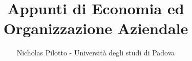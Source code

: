 \documentclass[12pt,a4paper]{article}
\begin{document}
    \author{Nicholas Pilotto - Università degli studi di Padova}
    \title{Appunti di Economia ed Organizzazione Aziendale}

    \maketitle
    \newpage
    \tableofcontents
    \newpage
    \listoffigures
    \listoftables
	\newpage
	
	
\end{document}
